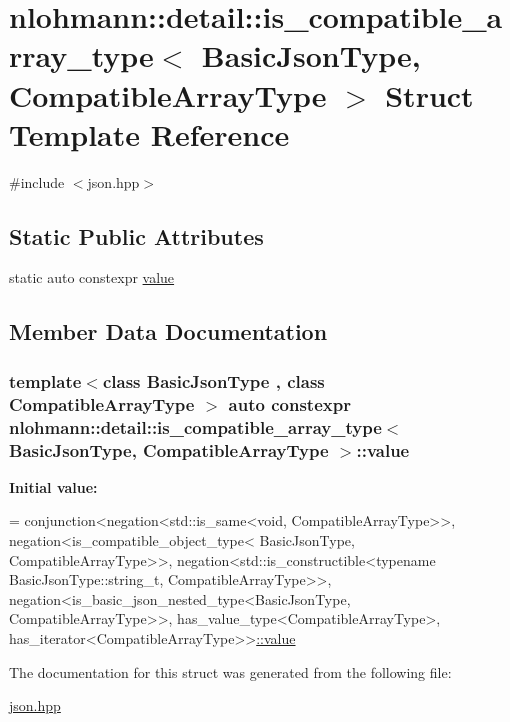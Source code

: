 \hypertarget{structnlohmann_1_1detail_1_1is__compatible__array__type}{}\section{nlohmann\+:\+:detail\+:\+:is\+\_\+compatible\+\_\+array\+\_\+type$<$ Basic\+Json\+Type, Compatible\+Array\+Type $>$ Struct Template Reference}
\label{structnlohmann_1_1detail_1_1is__compatible__array__type}


{\ttfamily \#include $<$json.\+hpp$>$}

\subsection*{Static Public Attributes}
\begin{DoxyCompactItemize}
\item 
static auto constexpr \hyperlink{structnlohmann_1_1detail_1_1is__compatible__array__type_a01bc2274c22746bbb2cefd2acee8b572}{value}
\end{DoxyCompactItemize}


\subsection{Member Data Documentation}
\subsubsection[{\texorpdfstring{value}{value}}]{\setlength{\rightskip}{0pt plus 5cm}template$<$class Basic\+Json\+Type , class Compatible\+Array\+Type $>$ auto constexpr {\bf nlohmann\+::detail\+::is\+\_\+compatible\+\_\+array\+\_\+type}$<$ Basic\+Json\+Type, Compatible\+Array\+Type $>$\+::value\hspace{0.3cm}{\ttfamily [static]}}\hypertarget{structnlohmann_1_1detail_1_1is__compatible__array__type_a01bc2274c22746bbb2cefd2acee8b572}{}\label{structnlohmann_1_1detail_1_1is__compatible__array__type_a01bc2274c22746bbb2cefd2acee8b572}
{\bfseries Initial value\+:}
\begin{DoxyCode}
=
        conjunction<negation<std::is\_same<void, CompatibleArrayType>>,
        negation<is\_compatible\_object\_type<
        BasicJsonType, CompatibleArrayType>>,
        negation<std::is\_constructible<\textcolor{keyword}{typename} BasicJsonType::string\_t,
        CompatibleArrayType>>,
        negation<is\_basic\_json\_nested\_type<BasicJsonType, CompatibleArrayType>>,
        has\_value\_type<CompatibleArrayType>,
        has\_iterator<CompatibleArrayType>>\hyperlink{structnlohmann_1_1detail_1_1is__compatible__array__type_a01bc2274c22746bbb2cefd2acee8b572}{::value}
\end{DoxyCode}


The documentation for this struct was generated from the following file\+:\begin{DoxyCompactItemize}
\item 
\hyperlink{json_8hpp}{json.\+hpp}\end{DoxyCompactItemize}
